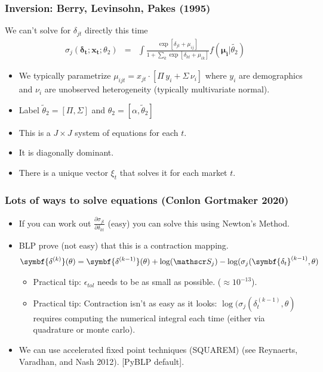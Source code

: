 \documentclass[aspectratio=169,10pt]{beamer}
\begin{document}
\begin{frame}
\frametitle{Inversion: Berry, Levinsohn, Pakes (1995)}
We can't solve for $\delta_{jt}$ directly this time
\begin{eqnarray*}
\sigma_j(\symbf{\delta_t}; \symbf{x_t}; \theta_2) &=& \int \frac{\exp[\delta_{jt} +  \mu_{ij} ]}{1+\sum_k \exp[\delta_{kt} + \mu_{ik} ]} f(\symbf{\mu_i}| \widetilde{\theta_2})
\end{eqnarray*}
 \begin{itemize}
    \item We typically parametrize $\mu_{ijt} = x_{jt} \cdot [\Pi \, y_i + \Sigma \, \nu_{i}]$ where $y_i$ are demographics and $\nu_i$ are unobserved heterogeneity (typically multivariate normal).
    \item Label $\widetilde{\theta}_2 = [\Pi, \Sigma]$ and $\theta_2 =[\alpha, \widetilde{\theta}_2 ]$
 \item This is a $J \times J$ system of equations for each $t$.
 \item It is diagonally dominant.
 \item There is a unique vector $\xi_t$ that solves it for each market $t$.
 \end{itemize}
\end{frame}

\begin{frame}
\frametitle{Lots of ways to solve equations (Conlon Gortmaker 2020)}
 \begin{itemize}
     \item If you can work out $\frac{\partial \sigma_{jt}}{\partial \delta_{kt}}$ (easy) you can solve this using Newton's Method. 
 \item BLP prove (not easy) that this is a \alert{contraction mapping}.
\begin{eqnarray*}
    \symbf{\delta^{(k)}}(\theta) = \symbf{\delta^{(k-1)}}(\theta) + \log(\calS_{j}) - \log(\sigma_{j}(\symbf{\delta_t}^{(k-1)}, \theta)
\end{eqnarray*}

\begin{itemize} 
  \item Practical tip: $\epsilon_{tol}$ needs to be as small as possible. ($\approx 10^{-13}$).
 \item Practical tip: Contraction isn't as easy as it looks:  $ \log(\sigma_{j}(\delta_t^{(k-1)}, \theta)$ requires computing the numerical integral each time (either via quadrature or monte carlo).
\end{itemize}
\item We can use \alert{accelerated fixed point} techniques (SQUAREM) (see Reynaerts, Varadhan, and Nash 2012). [PyBLP default].
  \end{itemize}
 \end{frame}
\end{document}
